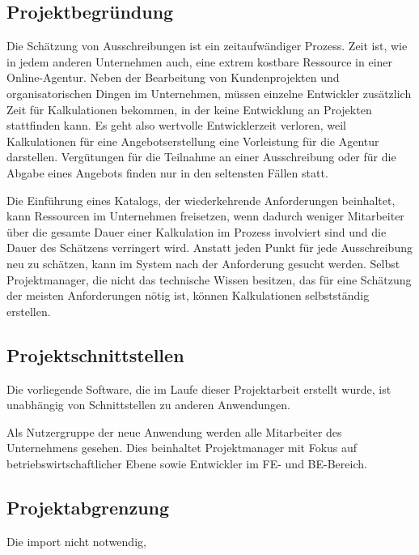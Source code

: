 \subsection{Projektbegründung} 
\label{sec:Projektbegruendung}
Die Schätzung von Ausschreibungen ist ein zeitaufwändiger Prozess. Zeit ist, wie
in jedem anderen Unternehmen auch, eine extrem kostbare Ressource in einer
Online-Agentur. Neben der Bearbeitung von Kundenprojekten und organisatorischen
Dingen im Unternehmen, müssen einzelne Entwickler zusätzlich Zeit für
Kalkulationen bekommen, in der keine Entwicklung an Projekten stattfinden kann.
Es geht also wertvolle Entwicklerzeit verloren, weil Kalkulationen für eine
Angebotserstellung eine Vorleistung für die Agentur darstellen. Vergütungen
für die Teilnahme an einer Ausschreibung oder für die Abgabe eines Angebots
finden nur in den seltensten Fällen statt.

Die Einführung eines Katalogs, der wiederkehrende Anforderungen beinhaltet, kann
Ressourcen im Unternehmen freisetzen, wenn dadurch weniger Mitarbeiter über die
gesamte Dauer einer Kalkulation im Prozess involviert sind und die Dauer des
Schätzens verringert wird. Anstatt jeden Punkt für jede Ausschreibung neu zu
schätzen, kann im System nach der Anforderung gesucht werden. Selbst
Projektmanager, die nicht das technische Wissen besitzen, das für eine Schätzung
der meisten Anforderungen nötig ist, können Kalkulationen selbstständig
erstellen.

\subsection{Projektschnittstellen} 
\label{sec:Projektschnittstellen}
Die vorliegende Software, die im Laufe dieser Projektarbeit erstellt wurde, ist
unabhängig von Schnittstellen zu anderen Anwendungen. 

Als Nutzergruppe der neue Anwendung werden alle Mitarbeiter des Unternehmens
gesehen. Dies beinhaltet Projektmanager mit Fokus auf betriebswirtschaftlicher
Ebene sowie Entwickler im \acs{FE}- und \acs{BE}-Bereich.

\subsection{Projektabgrenzung} 
\label{sec:Projektabgrenzung}
Die {\untertitel}
import nicht notwendig, 